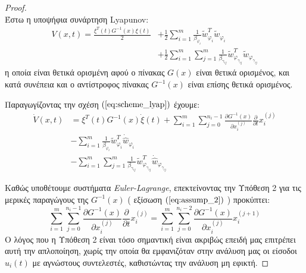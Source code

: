 \begin{proof}\\
Έστω η υποψήφια συνάρτηση Lyapunov:
\begin{equation}
	\begin{split}
	V(x,t) = \frac{\xi^T(t) G^{-1}(x) \xi(t)}{2} 
		   &+ \frac{1}{2} \sum_{i=1}^{m} \frac{1}{\beta_{\varphi_i} }
		   \tilde{w}_{\varphi_i}^{T} \tilde{w}_{\varphi_i} \\
		   &+ \frac{1}{2} \sum_{i=1}^{m} \sum_{j=1}^{m} \frac{1}{\beta_{\gamma_{ij}}}
		   \tilde{w}_{\varphi_{\gamma_{ij}}}^{T} \tilde{w}_{\varphi_{\gamma_{ij}}}
	\end{split}
	\label{eq:scheme_lyap}
\end{equation}
η οποία είναι θετικά ορισμένη αφού ο πίνακας $G(x)$ είναι θετικά ορισμένος, και κατά συνέπεια και ο αντίστροφος πίνακας $G^{-1}(x)$ είναι επίσης θετικά ορισμένος.

Παραγωγίζοντας την σχέση $(\ref{eq:scheme_lyap})$ έχουμε:
\begin{equation}
\begin{split}
	\dot{V}(x,t) &= \xi^T(t) G^{-1}(x) \dot{\xi}(t)
		   + \sum_{i=1}^{m} \sum_{j=0}^{n_i - 1} 
		     \frac{\partial G^{-1}(x) }{\partial x_i^{(j)}} 
		     \frac{\partial }{\partial t} x_i^{(j)} \\
	& - \sum_{i=1}^{m} \frac{1}{\beta_{\varphi_i} }
	\tilde{w}_{\varphi_i}^{T} \dot{\hat{w}}_{\varphi_i} \\
	& - \sum_{i=1}^{m} \sum_{j=1}^{m} \frac{1}{\beta_{\gamma_{ij}}}
	\tilde{w}_{\varphi_{\gamma_{ij}}}^{T} \dot{\hat{w}}_{\varphi_{\gamma_{ij}}}
\end{split}
\label{eq:scheme_lyap_derivative}
\end{equation}

Καθώς υποθέτουμε συστήματα \emph{Euler-Lagrange}, επεκτείνοντας την Υπόθεση 2 για τις μερικές παραγώγους της $G^{-1}(x)$ ( εξίσωση $(\ref{eq:assump_2})$ ) προκύπτει:
\begin{equation*}
	\sum_{i=1}^{m} \sum_{j=0}^{n_i - 1} 
	\frac{\partial G^{-1}(x) }{\partial x_i^{(j)}} 
	\frac{\partial }{\partial t} x_i^{(j)} = 
	\sum_{i=1}^{m} \sum_{j=0}^{n_i - 2} 
	\frac{\partial G^{-1}(x) }{\partial x_i^{(j)}} 
	x_i^{(j +1)}
\end{equation*}
Ο λόγος που η Υπόθεση 2 είναι τόσο σημαντική είναι ακριβώς επειδή μας επιτρέπει αυτή την απλοποίηση, χωρίς την οποία θα εμφανιζόταν στην ανάλυση μας οι είσοδοι $u_i(t)$ με αγνώστους συντελεστές, καθιστώντας την ανάλυση μη εφικτή.


\end{proof}
